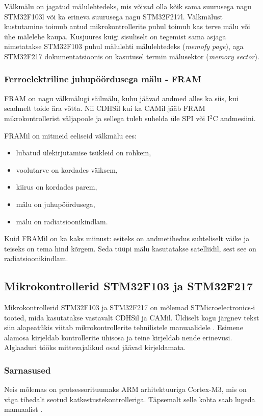 \documentclass[12pt,a4paper]{article}
\newcommand{\iic}{I${}^2$C }
\begin{document}
Välkmälu on jagatud mälulehtedeks, mis võivad olla kõik sama suurusega nagu
STM32F103l või ka erineva suurusega nagu STM32F217l. Välkmälust kustutamine
toimub antud mikrokontrollerite puhul toimub kas terve mälu või ühe mälelehe
kaupa. Kusjuures kuigi sisuliselt on tegemist sama asjaga nimetatakse STM32F103
puhul mälulehti mälulehtedeks (\textit{memofy page}), aga STM32F217
dokumentatsioonis on kasutusel termin mälusektor (\textit{memory sector}).
\cite{f1fpm,f2fpm}

\subsubsection{Ferroelektriline juhupöördusega mälu - FRAM}
FRAM on nagu välkmälugi säilmälu, kuhu jäävad andmed alles ka siis, kui seadmelt
toide ära võtta. Nii CDHSil kui ka CAMil jääb FRAM mikrokontrollerist väljapoole
ja sellega tuleb suhelda üle SPI või \iic andmesiini.

FRAMil on mitmeid eeliseid välkmälu ees:
\begin{itemize}
	\item lubatud ülekirjutamise tsükleid on rohkem,
	\item voolutarve on kordades väiksem,
	\item kiirus on kordades parem,
	\item mälu on juhupöördusega,
	\item mälu on radiatsioonikindlam.
\end{itemize}
Kuid FRAMil on ka kaks miinust: esiteks on andmetihedus suhteliselt väike ja teiseks
on tema hind kõrgem. Seda tüüpi mälu kasutatakse satelliidil, sest see on
radiatsioonikindlam. \cite{fram}

\subsection{Mikrokontrollerid STM32F103 ja STM32F217}
\label{sec:mcu}
Mikrokontrollerid STM32F103 ja STM32F217 on mõlemad STMicroelectronics-i tooted,
mida kasutatakse vastavalt CDHSil ja CAMil. Üldiselt kogu järgnev tekst siin
alapeatükis viitab mikrokontrollerite tehnilistele manuaalidele
\cite{f1rm,f2rm}. Esimene alamosa kirjeldab kontrollerite ühisosa ja teine
kirjeldab nende erinevusi. Alglaaduri tööks mittevajalikud osad jäävad
kirjeldamata.
\subsubsection{Sarnasused}
Neis mõlemas on protsessorituumaks ARM arhitektuuriga Cortex-M3, mis on väga
tihedalt seotud katkestustekontrolleriga. Täpsemalt selle kohta saab lugeda
manuaalist \cite{CM3pm}.
\end{document}
